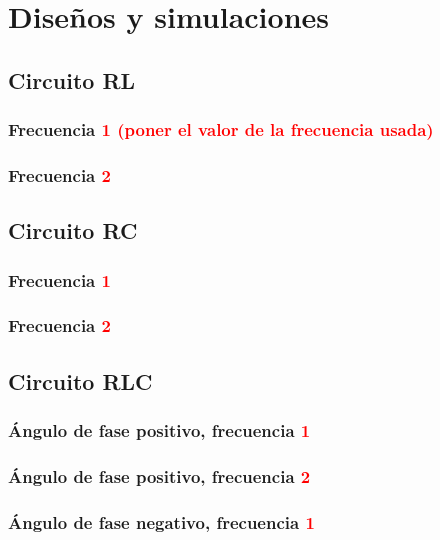 \documentclass[twocolumn,11pts]{IEEEtran}
\begin{document}

\section{Diseños y simulaciones}

\subsection{Circuito RL}
\subsubsection{Frecuencia \textcolor{red}{1 (poner el valor de la frecuencia usada)}}
\subsubsection{Frecuencia \textcolor{red}{2}}
\subsection{Circuito RC}
\subsubsection{Frecuencia \textcolor{red}{1}}
\subsubsection{Frecuencia \textcolor{red}{2}}
\subsection{Circuito RLC}

\subsubsection{Ángulo de fase positivo, frecuencia \textcolor{red}{1}}

\subsubsection{Ángulo de fase positivo, frecuencia \textcolor{red}{2}}

\subsubsection{Ángulo de fase negativo, frecuencia \textcolor{red}{1}}
\end{document}
